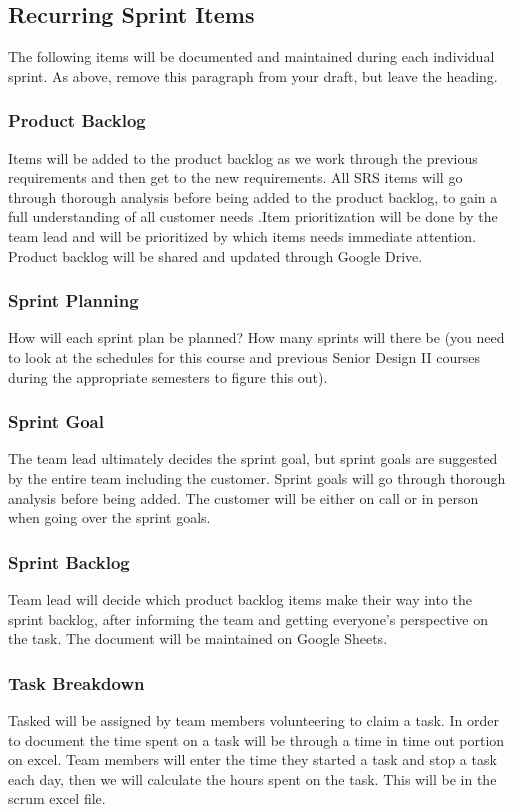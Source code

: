 \subsection{Recurring Sprint Items}
The following items will be documented and maintained during each individual sprint. As above, remove this paragraph from your draft, but leave the heading.

\subsubsection{Product Backlog}
Items will be added to the product backlog as we work through the previous requirements and then get to the new requirements. All SRS items will go through thorough analysis before being added to the product backlog, to gain a full understanding of all customer needs .Item prioritization will be done by the team lead and will be prioritized by which items needs immediate attention. Product backlog will be shared and updated through Google Drive.

\subsubsection{Sprint Planning}
How will each sprint plan be planned? How many sprints will there be (you need to look at the schedules for this course and previous Senior Design II courses during the appropriate semesters to figure this out).

\subsubsection{Sprint Goal}
The team lead ultimately decides the sprint goal, but sprint goals are suggested by the entire team including the customer. Sprint goals will go through thorough analysis before being added. The customer will be either on call or in person when going over the sprint goals.

\subsubsection{Sprint Backlog}
Team lead will decide which product backlog items make their way into the sprint backlog, after informing the team and getting everyone's perspective on the task. The document will be maintained on Google Sheets. 

\subsubsection{Task Breakdown}
Tasked will be assigned by team members volunteering to claim a task. In order to document the time spent on a task will be through a time in time out portion on excel. Team members will enter the time they started a task and stop a task each day, then we will calculate the hours spent on the task. This will be in the scrum excel file.

